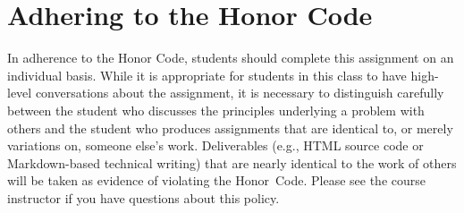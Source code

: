 \documentclass[11pt]{article}
\begin{document}
\section*{Adhering to the Honor Code}

In adherence to the Honor Code, students should complete this assignment on an
individual basis. While it is appropriate for students in this class to have
high-level conversations about the assignment, it is necessary to distinguish
carefully between the student who discusses the principles underlying a problem
with others and the student who produces assignments that are identical to, or
merely variations on, someone else's work. Deliverables (e.g., HTML source code
or Markdown-based technical writing) that are nearly identical to the work of
others will be taken as evidence of violating the \mbox{Honor Code}. Please see
the course instructor if you have questions about this policy.
\end{document}
